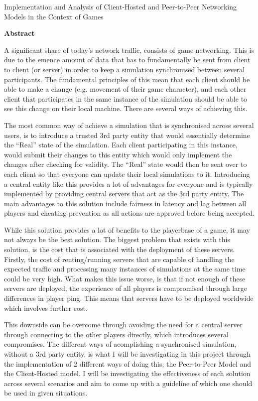 \thispagestyle{plain}
\begin{center}
  \makeatletter
  \Large
  \textbf{\@title}

  \vspace*{0.4cm}
  \large
  Implementation and Analysis of Client-Hosted and Peer-to-Peer Networking Models in the Context of Games

  \vspace*{0.4cm}
  \textbf{\@author}

  \vspace*{0.9cm}
  \textbf{Abstract}
  \makeatother
\end{center}
A significant share of today's network traffic, consists of game networking. This is due to the emence amount of data that has to fundamentally be sent from client to client (or server) in order to keep a simulation synchronised between several participants. The fundamental principles of this mean that each client should be able to make a change (e.g. movement of their game character), and each other client that participates in the same instance of the simulation should be able to see this change on their local machine. There are several ways of achieving this.

The most common way of achieve a simulation that is synchronised across several users, is to introduce a trusted 3rd party entity that would essentially determine the ``Real'' state of the simulation. Each client participating in this instance, would submit their changes to this entity which would only implement the changes after checking for validity. The ``Real'' state would then be sent over to each client so that everyone can update their local simulations to it. Introducing a central entity like this provides a lot of advantages for everyone and is typically implemented by providing central servers that act as the 3rd party entity. The main advantages to this solution include fairness in latency and lag between all players and cheating prevention as all actions are approved before being accepted.

While this solution provides a lot of benefits to the playerbase of a game, it may not always be the best solution. The biggest problem that exists with this solution, is the cost that is associated with the deployment of these servers. Firstly, the cost of renting/running servers that are capable of handling the expected traffic and processing many instances of simulations at the same time could be very high. What makes this issue worse, is that if not enough of these servers are deployed, the experience of all players is compromised through large differences in player ping. This means that servers have to be deployed worldwide which involves further cost.

This downside can be overcome through avoiding the need for a central server through connecting to the other players directly, which introduces several compromises. The different ways of acomplishing a synchronised simulation, without a 3rd party entity, is what I will be investigating in this project through the implementation of 2 different ways of doing this; the Peer-to-Peer Model and the Client-Hosted model. I will be investigating the effectiveness of each solution across several scenarios and aim to come up with a guideline of which one should be used in given situations.
